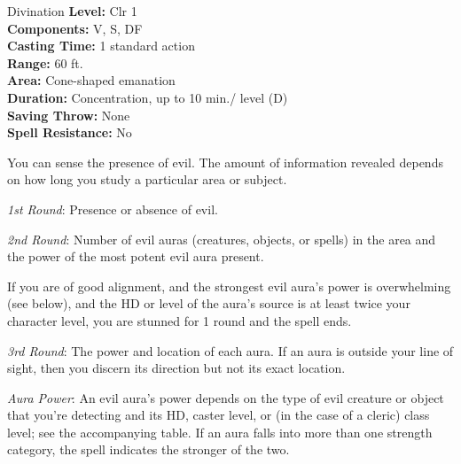 {Divination}
{
	\textbf{Level:}
	Clr 1\\
	\textbf{Components:}
	V, S, DF\\
	\textbf{Casting Time:}
	1 standard action\\
	\textbf{Range:}
	60 ft.\\
	\textbf{Area:}
	Cone-shaped emanation\\
	\textbf{Duration:}
	Concentration, up to 10 min./ level (D)\\
	\textbf{Saving Throw:}
	None\\
	\textbf{Spell Resistance:}
	No\\
}
{
	You can sense the presence of evil. The amount of information revealed depends on how long you study a particular area or subject.

	\textit{1st Round}:
	Presence or absence of evil.

	\textit{2nd Round}:
	Number of evil auras (creatures, objects, or spells) in the area and the power of the most potent evil aura present.

	If you are of good alignment, and the strongest evil aura's power is overwhelming (see below), and the HD or level of the aura's source is at least twice your character level, you are stunned for 1 round and the spell ends.

	\textit{3rd Round}:
	The power and location of each aura. If an aura is outside your line of sight, then you discern its direction but not its exact location.

	\textit{Aura Power}:
	An evil aura's power depends on the type of evil creature or object that you're detecting and its HD, caster level, or (in the case of a cleric) class level; see the accompanying table. If an aura falls into more than one strength category, the spell indicates the stronger of the two.

}
